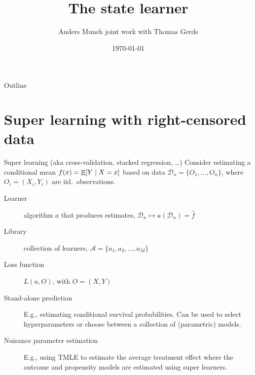 \documentclass[smaller]{beamer}\usepackage{listings}
\author{Anders Munch \newline \small joint work with Thomas Gerds}
\date{\today}
\title{The state learner}
\begin{document}
\maketitle
\begin{frame}{Outline}
\tableofcontents
\end{frame}

\section{Super learning with right-censored data}
\label{sec:org2409508}
\begin{frame}[label={sec:org633a41e}]{Super learning \small (aka cross-validation, stacked regression, \ldots{})}
Consider estimating a conditional mean \(f(x) = {\mathop{{\mathbb{E}}}}[Y \mid X=x]\) based on data
\(\mathcal{D}_n = \{O_1, \dots, O_n\}\), where \(O_i = (X_i, Y_i)\) are
iid.~observations.

\begin{description}
\item[{Learner}] algorithm \(a\) that produces estimates, \(\mathcal{D}_n \mapsto
  a(\mathcal{D}_n) = \hat f\)
\item[{Library}] collection of learners, \(\mathcal{A} = \{a_1, a_2, \dots, a_M \}\)
\item[{Loss function}] \(L(a, O)\), with \(O = (X,Y)\)
\end{description}

\vfill

\begin{description}
\item[{Stand-alone prediction}] E.g., estimating conditional survival probabilities.
Can be used to select hyperparameters or choose between a collection of
(parametric) models.
\item[{Nuisance parameter estimation}] E.g., using TMLE to estimate the average
treatment effect where the outcome and propensity models are estimated using
super learners.
\end{description}
\end{frame}
\end{document}
